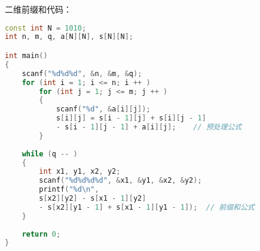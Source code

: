 二维前缀和代码：

\begin{lstlisting}[language=cpp]
const int N = 1010;
int n, m, q, a[N][N], s[N][N];

int main()
{
    scanf("%d%d%d", &n, &m, &q);
    for (int i = 1; i <= n; i ++ )
        for (int j = 1; j <= m; j ++ )
        {
            scanf("%d", &a[i][j]);
            s[i][j] = s[i - 1][j] + s[i][j - 1] 
            - s[i - 1][j - 1] + a[i][j];    // 预处理公式
        }
        
    while (q -- )
    {
        int x1, y1, x2, y2;
        scanf("%d%d%d%d", &x1, &y1, &x2, &y2);
        printf("%d\n", 
        s[x2][y2] - s[x1 - 1][y2] 
        - s[x2][y1 - 1] + s[x1 - 1][y1 - 1]);  // 前缀和公式
    }
    
    return 0;
}
\end{lstlisting}
